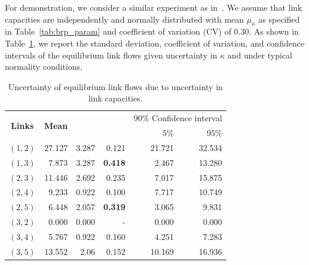 \documentclass[a4paper,11pt]{article}
\begin{document}
For demonstration, we consider a similar experiment as in~\cite{yang2013sensitivity}. We assume that link capacities are independently and normally distributed with mean $\mu_{\kappa}$ as specified in Table~\ref{tab:brp_param} and coefficient of variation (CV) of 0.30. As shown in Table~\ref{tab:uncertainty}, we report the standard deviation, coefficient of variation, and confidence intervals of the equilibrium link flows given uncertainty in $\kappa$ and under typical normality conditions.

\begin{table}[H]
\captionsetup{justification=centering}
\caption{Uncertainty of equilibrium link flows due to uncertainty in link capacities.}\label{tab:uncertainty}
\setlength\tabcolsep{8pt}
\centering
\begin{tabular}{crrrrr}
\multicolumn{1}{c}{\multirow{2}{*}{\textbf{Links}}} & \multicolumn{1}{c}{\multirow{2}{*}{\textbf{Mean}}} & {\multirow{2}{*}{\textbf{Std. Dev.}}} & {\multirow{2}{*}{\textbf{CV}}} & \multicolumn{2}{c}{90\% Confidence interval} \\
                  &                             &        &         &  5\%  &         95\%          \\
\midrule
$(1, 2)$                                          & 27.127                                           & 3.287          & 0.121            & 21.721             & 32.534              \\
$(1, 3)$                                          & 7.873                                            & 3.287           & \textbf{0.418}             & 2.467              & 13.280               \\
$(2, 3)$                                          & 11.446                                           & 2.692          & 0.235            & 7.017             & 15.875              \\
$(2, 4)$                                          & 9.233                                            & 0.922           & 0.100            & 7.717             & 10.749                  \\
$(2, 5)$                                         & 6.448                                            & 2.057           & \textbf{0.319}             & 3.065             & 9.831              \\
$(3, 2)$                                          & 0.000                                            & 0.000           & -             & 0.000              & 0.000             \\
$(3, 4)$                                         & 5.767                                            & 0.922           & 0.160             & 4.251              & 7.283             \\
$(3, 5)$                                          & 13.552                                           & 2.06         & 0.152            & 10.169             & 16.936             \\
\bottomrule
\end{tabular}
\end{table}
\end{document}
